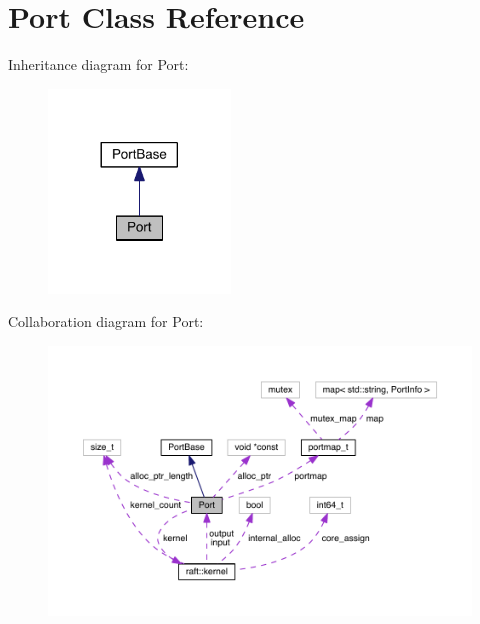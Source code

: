 \hypertarget{class_port}{}\section{Port Class Reference}
\label{class_port}


Inheritance diagram for Port\+:
\nopagebreak
\begin{figure}[H]
\begin{center}
\leavevmode
\includegraphics[width=137pt]{class_port__inherit__graph}
\end{center}
\end{figure}


Collaboration diagram for Port\+:
\nopagebreak
\begin{figure}[H]
\begin{center}
\leavevmode
\includegraphics[width=350pt]{class_port__coll__graph}
\end{center}
\end{figure}
